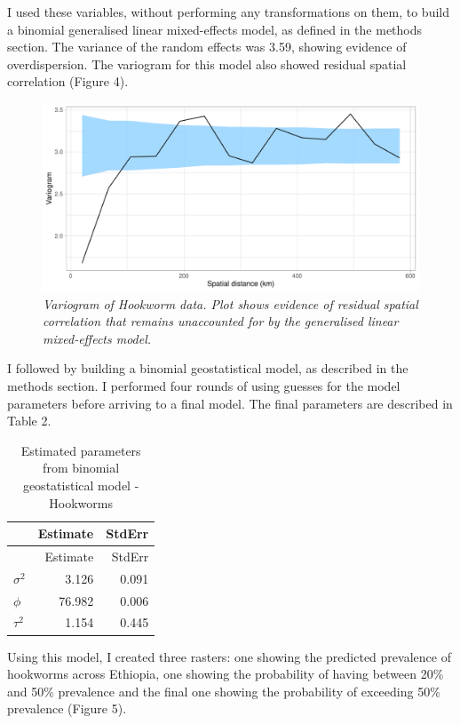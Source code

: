 \documentclass[
]{article}
\begin{document}
I used these variables, without performing any transformations on them,
to build a binomial generalised linear mixed-effects model, as defined
in the methods section. The variance of the random effects was 3.59,
showing evidence of overdispersion. The variogram for this model also
showed residual spatial correlation (Figure 4).

\begin{figure}
\centering
\includegraphics{write_up_files/figure-latex/HK.variogram_2-1.pdf}
\caption{\textit{Variogram of Hookworm data. Plot shows evidence of residual spatial correlation that remains unaccounted for by the generalised linear mixed-effects model.}}
\end{figure}

I followed by building a binomial geostatistical model, as described in
the methods section. I performed four rounds of using guesses for the
model parameters before arriving to a final model. The final parameters
are described in Table 2.

\begin{longtable}[]{@{}lrr@{}}
\caption{Estimated parameters from binomial geostatistical model -
Hookworms}\tabularnewline
\toprule
& Estimate & StdErr \\
\midrule
\endfirsthead
\toprule
& Estimate & StdErr \\
\midrule
\endhead
\(\sigma^2\) & 3.126 & 0.091 \\
\(\phi\) & 76.982 & 0.006 \\
\(\tau^2\) & 1.154 & 0.445 \\
\bottomrule
\end{longtable}

Using this model, I created three rasters: one showing the predicted
prevalence of hookworms across Ethiopia, one showing the probability of
having between 20\% and 50\% prevalence and the final one showing the
probability of exceeding 50\% prevalence (Figure 5).
\end{document}
